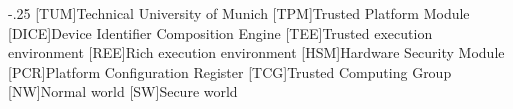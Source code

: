\documentclass[headsepline,footsepline,footinclude=false,oneside,fontsize=11pt,paper=a4,listof=totoc,bibliography=totoc]{scrbook} %
\begin{document}


\frontmatter{}





\tableofcontents{}

\mainmatter{}

%








\appendix{}


\begin{acronym}
	\itemsep-.25\baselineskip
	[TUM]{Technical University of Munich}
	[TPM]{Trusted Platform Module}
	[DICE]{Device Identifier Composition Engine}
	[TEE]{Trusted execution environment}
	[REE]{Rich execution environment}
	[HSM]{Hardware Security Module}
	[PCR]{Platform Configuration Register}
	[TCG]{Trusted Computing Group}
	[NW]{Normal world}
	[SW]{Secure world}
\end{acronym}

\listoffigures{}
\listoftables{}
\printbibliography{}
\end{document}
